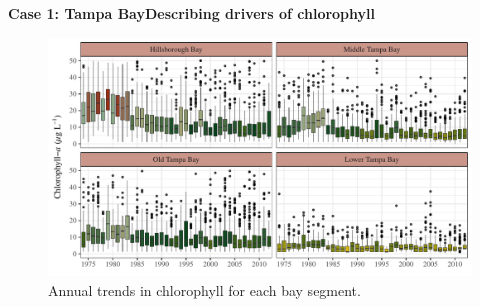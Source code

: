 \documentclass[serif]{beamer}\usepackage[]{graphicx}\usepackage[]{color}
\begin{document}
\begin{frame}{\textbf{Case 1: Tampa Bay}}{\textbf{Describing drivers of chlorophyll}}
\begin{figure}[!ht]

{\centering \includegraphics[width=\linewidth]{fig/annual_chl-1} 

}

\caption[Annual trends in chlorophyll for each bay segment]{Annual trends in chlorophyll for each bay segment.}\label{fig:annual_chl}
\end{figure}


\end{frame}

\end{document}
